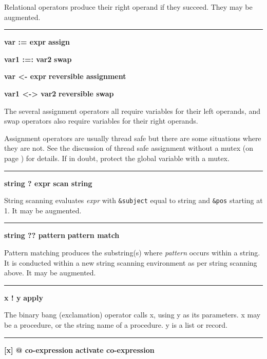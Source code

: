 \noindent
Relational operators produce their right operand if they succeed. They
may be augmented.

\bigskip\hrule\vspace{0.1cm}

\noindent
{\bf var := expr } \hfill {\bf assign}

\noindent
{\bf var1 :=: var2 } \hfill {\bf swap}\WarningNotThreadSafe
{}

\noindent
{\bf var {\textless}- expr } \hfill {\bf reversible assignment}

\noindent
{\bf var1 {\textless}-{\textgreater} var2 } \hfill {\bf reversible swap}\WarningNotThreadSafe
{}

\noindent
The several assignment
operators all require variables for their left operands, and swap
operators also require variables for their right operands.

Assignment operators are usually thread safe \ConcurrencyIssue
but there are some situations where they are not. 
See the discussion of thread safe assignment without a mutex (on page
\pageref{ThreadSafeAssignment}) for details. If in doubt, protect the
global variable with a mutex.

\bigskip\hrule\vspace{0.1cm}
\noindent
{\bf string ? expr } \hfill {\bf scan string}

\noindent
{}String scanning evaluates \textit{expr}
with \texttt{\&subject} equal to string and \texttt{\&pos} starting at
1. It may be augmented.

\bigskip\hrule\vspace{0.1cm}
\noindent
{\bf string ?? pattern } \hfill {\bf pattern match}

\noindent
{}Pattern matching produces the substring(s) where
\textit{pattern} occurs within a string. It is conducted within a new
string scanning environment as per string scanning above. It may be augmented.

\bigskip\hrule\vspace{0.1cm}
\noindent
{\bf x ! y } \hfill {\bf apply}

\noindent
{}The binary bang (exclamation) operator calls x,
using y as its parameters.  x may be a procedure, or the string name of
a procedure.  y is a list or record.

\bigskip\hrule\vspace{0.1cm}
\noindent
{\bf [x] @ co-expression } \hfill {\bf activate co-expression}

